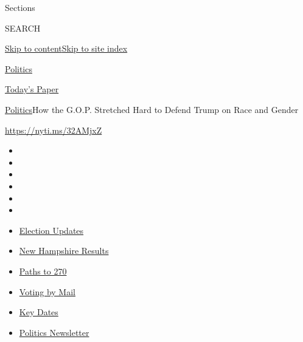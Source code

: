 Sections

SEARCH

\protect\hyperlink{site-content}{Skip to
content}\protect\hyperlink{site-index}{Skip to site index}

\href{https://www.nytimes3xbfgragh.onion/section/politics}{Politics}

\href{https://myaccount.nytimes3xbfgragh.onion/auth/login?response_type=cookie\&client_id=vi}{}

\href{https://www.nytimes3xbfgragh.onion/section/todayspaper}{Today's
Paper}

\href{/section/politics}{Politics}\textbar{}How the G.O.P. Stretched
Hard to Defend Trump on Race and Gender

\url{https://nyti.ms/32AMjxZ}

\begin{itemize}
\item
\item
\item
\item
\item
\item
\end{itemize}

\begin{itemize}
\item
  \href{https://www.nytimes3xbfgragh.onion/live/2020/09/09/us/trump-vs-biden?action=click\&pgtype=Article\&state=default\&region=TOP_BANNER\&context=storylines_menu}{Election
  Updates}
\item
  \href{https://www.nytimes3xbfgragh.onion/interactive/2020/09/08/us/elections/results-new-hampshire-primary-elections.html?action=click\&pgtype=Article\&state=default\&region=TOP_BANNER\&context=storylines_menu}{New
  Hampshire Results}
\item
  \href{https://www.nytimes3xbfgragh.onion/interactive/2020/us/elections/election-states-biden-trump.html?action=click\&pgtype=Article\&state=default\&region=TOP_BANNER\&context=storylines_menu}{Paths
  to 270}
\item
  \href{https://www.nytimes3xbfgragh.onion/interactive/2020/08/31/us/politics/vote-by-mail-deadlines.html?action=click\&pgtype=Article\&state=default\&region=TOP_BANNER\&context=storylines_menu}{Voting
  by Mail}
\item
  \href{https://www.nytimes3xbfgragh.onion/interactive/2019/us/elections/2020-presidential-election-calendar.html?action=click\&pgtype=Article\&state=default\&region=TOP_BANNER\&context=storylines_menu}{Key
  Dates}
\item
  \href{https://www.nytimes3xbfgragh.onion/newsletters/politics?action=click\&pgtype=Article\&state=default\&region=TOP_BANNER\&context=storylines_menu}{Politics
  Newsletter}
\end{itemize}

